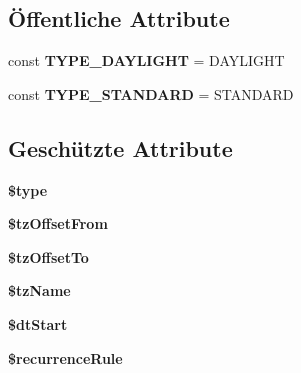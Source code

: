 \subsection*{Öffentliche Attribute}
\begin{DoxyCompactItemize}
\item 
\mbox{\label{class_eluceo_1_1i_cal_1_1_component_1_1_timezone_rule_aeaeec240a3b390f0f73c0168cac929b5}} 
const {\bfseries T\+Y\+P\+E\+\_\+\+D\+A\+Y\+L\+I\+G\+HT} = \textquotesingle{}D\+A\+Y\+L\+I\+G\+HT\textquotesingle{}
\item 
\mbox{\label{class_eluceo_1_1i_cal_1_1_component_1_1_timezone_rule_a6fac21cbd8975f1cbdd770f3f9cfccc7}} 
const {\bfseries T\+Y\+P\+E\+\_\+\+S\+T\+A\+N\+D\+A\+RD} = \textquotesingle{}S\+T\+A\+N\+D\+A\+RD\textquotesingle{}
\end{DoxyCompactItemize}
\subsection*{Geschützte Attribute}
\begin{DoxyCompactItemize}
\item 
\mbox{\label{class_eluceo_1_1i_cal_1_1_component_1_1_timezone_rule_ae93c4ef926bc8c9ee31d0f8540524584}} 
{\bfseries \$type}
\item 
\mbox{\label{class_eluceo_1_1i_cal_1_1_component_1_1_timezone_rule_a827a68347e16d02d330a90cfa3062f59}} 
{\bfseries \$tz\+Offset\+From}
\item 
\mbox{\label{class_eluceo_1_1i_cal_1_1_component_1_1_timezone_rule_af9a4d3c671a21e5a1e735ec178dfb131}} 
{\bfseries \$tz\+Offset\+To}
\item 
\mbox{\label{class_eluceo_1_1i_cal_1_1_component_1_1_timezone_rule_a54e03d6af96ea931bcd885235ed211bd}} 
{\bfseries \$tz\+Name}
\item 
\mbox{\label{class_eluceo_1_1i_cal_1_1_component_1_1_timezone_rule_a2bfe6cd6e28014e9c9b311961de07efc}} 
{\bfseries \$dt\+Start}
\item 
\mbox{\label{class_eluceo_1_1i_cal_1_1_component_1_1_timezone_rule_a8d49f7f3f2ca81f0b8ea5dd1894b5b04}} 
{\bfseries \$recurrence\+Rule}
\end{DoxyCompactItemize}


